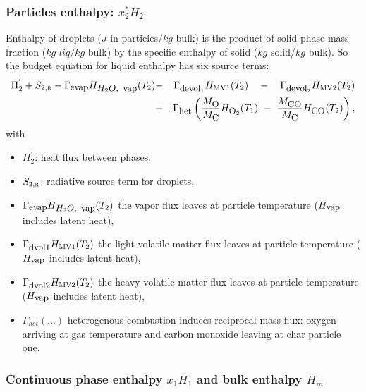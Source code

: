 \subsubsection{Particles enthalpy: $x_{2}^{*}H_{2}$ }

Enthalpy of droplets ($J$ in particles/$kg$ bulk) is the product of solid phase mass
fraction ($kg$ $liq/kg$ bulk) by the specific enthalpy of solid ($kg$ solid/$kg$
bulk). So the budget equation for liquid enthalpy has six source terms:
\begin{eqnarray*}
\Pi_{2}^{'}+S_{2,\mbox{\scriptsize\textsc{r}}}-\Gamma_{\mbox{\small evap}}H_{\mbox{\small $H_{2}O$,\, vap}}(T_{2}) & - & \Gamma_{\mbox{\small devol}_1}H_{\mbox{\scriptsize MV1}}(T_{2})\quad-\quad \Gamma_{\mbox{\small devol}_2}H_{\mbox{\scriptsize MV2}}(T_{2}) \\
                                                   & + &\Gamma_{\mbox{\small het}}\left( \dfrac{M_{\mbox{\small O}}}{M_{\mbox{\small C}}}H_{\mbox{\small O}_{2}}(T_{1})~ - ~\dfrac{M_{\mbox{\small CO}}}{M_{\mbox{\small C}}}H_{\mbox{\small CO}}(T_{2})\right),
\end{eqnarray*}
with
\begin{itemize}
  \item $\Pi_{2}^{'}$: heat flux between phases,
  \item $S_{2,\mbox{\scriptsize\textsc{r}}}$: radiative source term for droplets,
  \item $\Gamma_{\mbox{\small evap}}H_{\mbox{\small $H_{2}O$, \,vap}}(T_{2})$ the vapor
    flux leaves at particle temperature ($H_{\mbox{\small vap}}$ includes latent
    heat),
  \item $\Gamma_{\mbox{\small dvol1}}H_{\mbox{\scriptsize MV1}}(T_{2})$ the
    light volatile matter flux leaves at particle temperature ($H_{\mbox{\small
        vap}}$ includes latent heat),
  \item $\Gamma_{\mbox{\small dvol2}}H_{\mbox{\scriptsize MV2}}(T_{2})$ the
    heavy volatile matter flux leaves at particle temperature ($H_{\mbox{\small
        vap}}$ includes latent heat),
  \item $\Gamma_{het}(...)$ heterogenous combustion induces reciprocal mass
    flux: oxygen arriving at gas temperature and carbon monoxide leaving at char
    particle one.
\end{itemize}

\subsubsection{Continuous phase enthalpy $x_1 H_{1}$ and bulk enthalpy $H_{m}$ }

